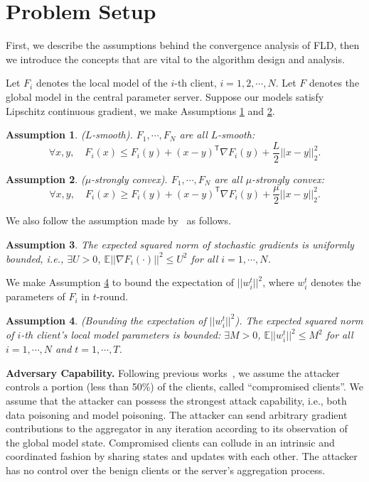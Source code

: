 \section{Problem Setup}\label{sec:problem}
First, we describe the assumptions behind the convergence analysis of FLD, then we introduce the concepts that are vital to the algorithm design and analysis.

Let $F_i$ denotes the local model of the $i$-th client, $i=1,2,\cdots,N$. Let $F$ denotes the global model in the central parameter server. Suppose our models satisfy Lipschitz continuous gradient, we make Assumptions \ref{assumption1} and \ref{assumption2}.
\newtheorem{assumption}{Assumption}
\begin{assumption}\label{assumption1}
($L$-smooth). $F_1, \cdots,F_N$ are all $L$-smooth: 
\begin{equation*}
    \forall x, y,\quad F_i(x)\leq F_i(y)+(x-y)^{\mathsf{T}}\nabla F_i(y)+\frac{L}{2}||x-y||_2^2.
\end{equation*}
\end{assumption}
 
\begin{assumption}\label{assumption2}
($\mu$-strongly convex). $F_1,\cdots,F_N$ are all $\mu$-strongly convex:
\begin{equation*}
    \forall x, y,\quad F_i(x)\geq F_i(y)+(x-y)^{\mathsf{T}}\nabla F_i(y)+\frac{\mu}{2}||x-y||_2^2.
\end{equation*}
\end{assumption}
We also follow the assumption made by~\cite{stich2018sparsified,yu2019parallel,li2019convergence} as follows.
\begin{assumption}\label{assumption3}
The expected squared norm of stochastic gradients is uniformly bounded, i.e., $\exists U>0$, $\mathbb{E}||\nabla F_i(\cdot)||^2 \leq U^2$ for all $i=1,\cdots,N$.
\end{assumption}
We make Assumption \ref{assumption4} to bound the expectation of $||w_i^t||^2$, where $w_i^t$ denotes the parameters of $F_i$ in $t$-round.
\begin{assumption}\label{assumption4}
(Bounding the expectation of $|| w_i^t ||^2$). The expected squared norm of $i$-th client's local model parameters is bounded: $\exists M>0$, $\mathbb{E}||w_i^t||^2 \leq M^2$ for all $i=1,\cdots,N$ and $t=1,\cdots,T$.
\end{assumption}

\noindent\textbf{Adversary Capability.} Following previous works~\cite{howtobackdoor,krum,munoz2019byzantine,nguyen2020poisoning}, we assume the attacker controls a portion (less than 50\%) of the clients, called ``compromised clients''. We assume that the attacker can possess the strongest attack capability, i.e., both data poisoning and model poisoning. The attacker can send arbitrary gradient contributions to the aggregator in any iteration according to its observation of the global model state. Compromised clients can collude in an intrinsic and coordinated fashion by sharing states and updates with each other. The attacker has no control over the benign clients or the server's aggregation process.

